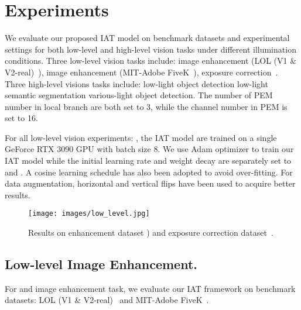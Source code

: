 \documentclass{bmvc2k}
\begin{document}
\vspace{-2mm}
\section{Experiments}
\vspace{-1mm}
We evaluate our proposed IAT model on benchmark datasets and experimental settings for both low-level and high-level vision tasks under different illumination conditions. Three low-level vision tasks include:  image enhancement (LOL (V1 \& V2-real)~\cite{LOL_dataset}),  image enhancement (MIT-Adobe FiveK~\cite{fivek_dataset}),  exposure correction~\cite{Exposure_2021_CVPR}. Three high-level visions tasks include:  low-light object detection  low-light semantic segmentation  various-light object detection. The number of PEM number in local branch are both set to 3, while the channel number in PEM is set to 16. 

For all low-level vision experiments: , the IAT model are trained on a single GeForce RTX 3090 GPU with batch size 8. We use Adam optimizer to train our IAT model while the initial learning rate and weight decay are separately set to  and . A cosine learning schedule has also been adopted to avoid over-fitting. For data augmentation, horizontal and vertical flips have been used to acquire better results.


\begin{figure}[t]
    \centering
    \texttt{[image: images/low\_level.jpg]}
    \caption{Results on enhancement dataset \cite{LOL_dataset,fivek_dataset}) and exposure correction dataset~\cite{Exposure_2021_CVPR}.}
    \label{fig:low_level}
    
\end{figure}


\subsection{Low-level Image Enhancement.}
\label{exp:image_enhancement}
For  and  image enhancement task, we evaluate our IAT framework on benchmark datasets: LOL (V1 \& V2-real)~\cite{LOL_dataset} and MIT-Adobe FiveK~\cite{fivek_dataset}. 
\end{document}
